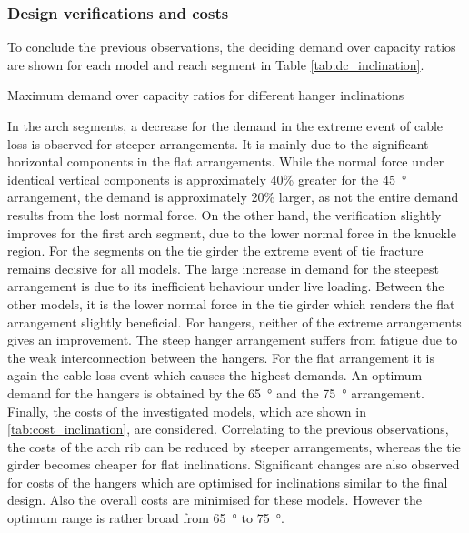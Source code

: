 \subsubsection{Design verifications and costs}
To conclude the previous observations, the deciding demand over capacity ratios are shown for each model and reach segment in Table \ref{tab:dc_inclination}.

\begin{table}[H]
    \centering
    \caption{Maximum demand over capacity ratios for different hanger inclinations}
    \label{tab:dc_inclination}
    \resizebox{\columnwidth}{!}{%
    
    }
\end{table}
In the arch segments, a decrease for the demand in the extreme event of cable loss is observed for steeper arrangements. It is mainly due to the significant horizontal components in the flat arrangements. While the normal force under identical vertical components is approximately 40\% greater for the \SI{45}{\degree} arrangement, the demand is approximately 20\% larger, as not the entire demand results from the lost normal force. On the other hand, the verification slightly improves for the first arch segment, due to the lower normal force in the knuckle region. For the segments on the tie girder the extreme event of tie fracture remains decisive for all models. The large increase in demand for the steepest arrangement is due to its inefficient behaviour under live loading. Between the other models, it is the lower normal force in the tie girder which renders the flat arrangement slightly beneficial. For hangers, neither of the extreme arrangements gives an improvement. The steep hanger arrangement suffers from fatigue due to the weak interconnection between the hangers. For the flat arrangement it is again the cable loss event which causes the highest demands. An optimum demand for the hangers is obtained by the \SI{65}{\degree} and the \SI{75}{\degree} arrangement. Finally, the costs of the investigated models, which are shown in \cref{tab:cost_inclination}, are considered. Correlating to the previous observations, the costs of the arch rib can be reduced by steeper arrangements, whereas the tie girder becomes cheaper for flat inclinations. Significant changes are also observed for costs of the hangers which are optimised for inclinations similar to the final design. Also the overall costs are minimised for these models. However the optimum range is rather broad from \SI{65}{\degree} to \SI{75}{\degree}.


